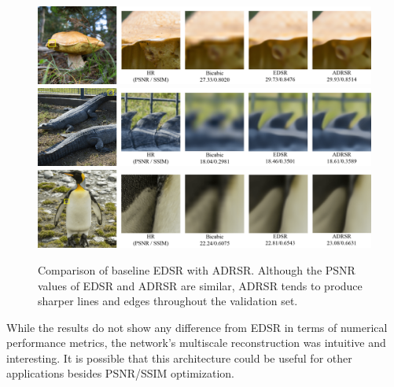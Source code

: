 \documentclass[10pt,twocolumn,letterpaper]{article}
\begin{document}
\begin{figure}[ht!]
    \centering
    
    \includegraphics[width=\textwidth]{Images/Samples/3-1.png}\\
    \includegraphics[width=\textwidth]{Images/Samples/3-2.png}\\
    \includegraphics[width=\textwidth]{Images/Samples/3-3.png}
    
    \caption{Comparison of baseline EDSR with ADRSR. Although the PSNR values of EDSR and ADRSR are similar, ADRSR tends to produce sharper lines and edges throughout the validation set.}
    \label{fig:adrsr}
\end{figure}

While the results do not show any difference from EDSR in terms of numerical performance metrics, the network's multiscale reconstruction was intuitive and interesting. It is possible that this architecture could be useful for other applications besides PSNR/SSIM optimization.

\end{document}
